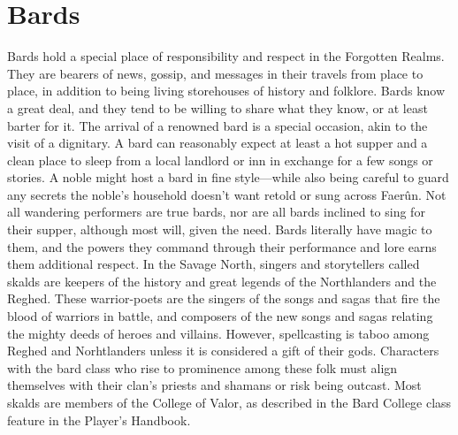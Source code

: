 \documentclass[10pt,a4paper,twoside,twocolumn,openany,bg=print,nodeprecatedcode]{dndbook}
\begin{document}
\section{Bards}
Bards hold a special place of responsibility and respect in the Forgotten Realms. They are bearers of news, gossip, and messages in their travels from place to place, in addition to being living storehouses of history and folklore. Bards know a great deal, and they tend to be willing to share what they know, or at least barter for it.
The arrival of a renowned bard is a special occasion, akin to the visit of a dignitary. A bard can reasonably expect at least a hot supper and a clean place to sleep from a local landlord or inn in exchange for a few songs or stories. A noble might host a bard in fine style—while also being careful to guard any secrets the noble's household doesn't want retold or sung across Faerûn.
Not all wandering performers are true bards, nor are all bards inclined to sing for their supper, although most will, given the need. Bards literally have magic to them, and the powers they command through their performance and lore earns them additional respect.
In the Savage North, singers and storytellers called skalds are keepers of the history and great legends of the Northlanders and the Reghed. These warrior-poets are the singers of the songs and sagas that fire the blood of warriors in battle, and composers of the new songs and sagas relating the mighty deeds of heroes and villains. However, spellcasting is taboo among Reghed and Norhtlanders unless it is considered a gift of their gods. Characters with the bard class who rise to prominence among these folk must align themselves with their clan's priests and shamans or risk being outcast. Most skalds are members of the College of Valor, as described in the Bard College class feature in the Player's Handbook.
\end{document}

